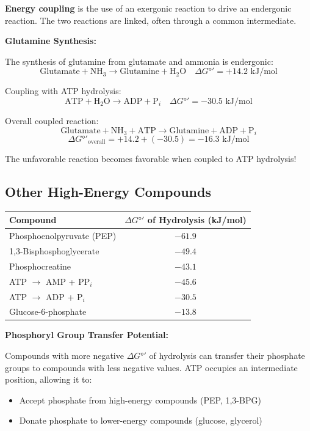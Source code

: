 \begin{definition}
\textbf{Energy coupling} is the use of an exergonic reaction to drive an endergonic reaction. The two reactions are linked, often through a common intermediate.
\end{definition}

\begin{example}
\textbf{Glutamine Synthesis:}

The synthesis of glutamine from glutamate and ammonia is endergonic:
\[
\text{Glutamate} + \text{NH}_3 \rightarrow \text{Glutamine} + \text{H}_2\text{O} \quad \Delta G°' = +14.2 \text{ kJ/mol}
\]

Coupling with ATP hydrolysis:
\[
\text{ATP} + \text{H}_2\text{O} \rightarrow \text{ADP} + \text{P}_i \quad \Delta G°' = -30.5 \text{ kJ/mol}
\]

Overall coupled reaction:
\[
\text{Glutamate} + \text{NH}_3 + \text{ATP} \rightarrow \text{Glutamine} + \text{ADP} + \text{P}_i
\]
\[
\Delta G°'_{\text{overall}} = +14.2 + (-30.5) = -16.3 \text{ kJ/mol}
\]

The unfavorable reaction becomes favorable when coupled to ATP hydrolysis!
\end{example}

\subsection{Other High-Energy Compounds}

\begin{center}
\begin{tabular}{lc}
\toprule
\textbf{Compound} & \textbf{$\Delta G°'$ of Hydrolysis (kJ/mol)} \\
\midrule
Phosphoenolpyruvate (PEP) & $-61.9$ \\
1,3-Bisphosphoglycerate & $-49.4$ \\
Phosphocreatine & $-43.1$ \\
ATP $\rightarrow$ AMP + PP$_i$ & $-45.6$ \\
ATP $\rightarrow$ ADP + P$_i$ & $-30.5$ \\
Glucose-6-phosphate & $-13.8$ \\
\bottomrule
\end{tabular}
\end{center}

\begin{theorem}
\textbf{Phosphoryl Group Transfer Potential:}

Compounds with more negative $\Delta G°'$ of hydrolysis can transfer their phosphate groups to compounds with less negative values. ATP occupies an intermediate position, allowing it to:
\begin{itemize}
    \item Accept phosphate from high-energy compounds (PEP, 1,3-BPG)
    \item Donate phosphate to lower-energy compounds (glucose, glycerol)
\end{itemize}
\end{theorem}

